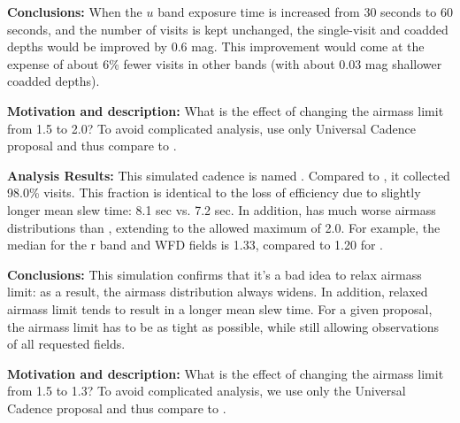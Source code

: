 {\bf Conclusions:} When the $u$ band exposure time is increased from
30 seconds to 60 seconds, and the number of visits is kept unchanged,
the single-visit and coadded depths would be improved by 0.6 mag. This
improvement would come at  the expense of about 6\% fewer visits in
other bands (with about 0.03 mag shallower coadded depths).




{\bf Motivation and description:}  What is the effect of changing the
airmass limit from 1.5 to 2.0?  To avoid complicated analysis, use
only Universal Cadence proposal and thus compare to
.


{\bf Analysis Results:}  This simulated cadence is named
.  Compared to
, it collected 98.0\% visits. This fraction is
identical to the loss of efficiency due to slightly longer mean slew
time: 8.1 sec vs. 7.2 sec. In addition,
 has much worse airmass
distributions than ,  extending to the allowed
maximum of 2.0. For example, the median for the r band and WFD fields
is 1.33, compared to 1.20 for .

{\bf Conclusions:} This simulation confirms that it's a bad idea to
relax airmass limit: as a result, the airmass distribution always
widens. In addition, relaxed airmass limit tends to result in a longer
mean slew time.  For a given proposal, the airmass limit has to be as
tight as possible, while still allowing observations of all requested
fields.




{\bf Motivation and description:} What is the effect of changing the
airmass limit from 1.5 to 1.3? To avoid complicated analysis, we use
only the Universal Cadence proposal and thus compare to
.


